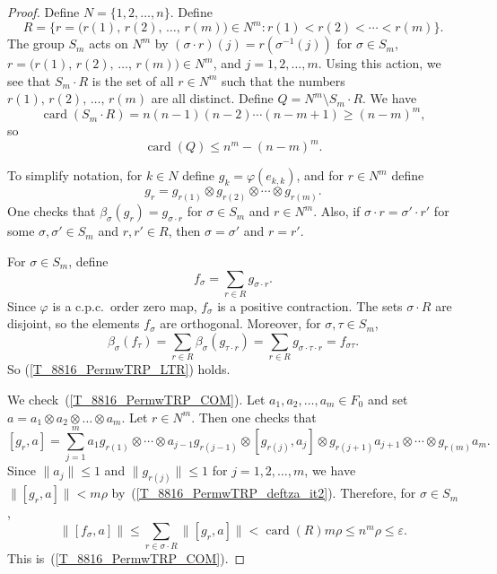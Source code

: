 \documentclass[11pt]{amsart}
\theoremstyle{plain}
\theoremstyle{definition}
\theoremstyle{remark}
\numberwithin{equation}{section}
\newcommand{\bt}{\beta}
\newcommand{\ep}{\varepsilon}
\newcommand{\sm}{\sigma}
\newcommand{\ph}{\varphi}
\newcommand{\rh}{\rho}
\newcommand{\ta}{\tau}
\newcommand{\card}{{\operatorname{card}}}
\begin{document}
\begin{proof}
Define $N = \{ 1, 2, \ldots, n \}$.
Define
\[
R = \bigl\{ r = \bigl( r (1), \, r (2), \, \ldots, \, r (m) \bigr)
   \in N^m \colon r (1) < r (2) < \cdots < r (m) \bigr\}.
\]
The group $S_m$ acts on $N^m$
by $(\sm \cdot r) (j) = r (\sm^{-1} (j))$
for $\sm \in S_m$,
$r = \bigl( r (1), \, r (2), \, \ldots, \, r (m) \bigr) \in N^m$,
and $j = 1, 2, \ldots, m$.
Using this action,
we see that $S_m \cdot R$
is the set of all $r \in N^m$ such that the numbers
$r (1), \, r (2), \, \ldots, \, r (m)$ are all distinct.
Define $Q = N^m \setminus S_m \cdot R$.
We have
%
\begin{equation}\label{Eq_8816_CardSmR}
\card (S_m \cdot R)
 = n (n - 1) (n - 2) \cdots (n - m + 1)
 \geq (n - m)^m,
\end{equation}
%
so
%
\begin{equation}\label{Eq_8816_CardQ}
\card (Q) \leq n^m -  (n - m)^m.
\end{equation}
%

To simplify notation,
for $k \in N$ define $g_k = \ph (e_{k, k})$,
and for $r \in N^m$ define
\[
g_r = g_{r (1)} \otimes g_{r (2)} \otimes \cdots \otimes g_{r (m)}.
\]
One checks that $\bt_{\sm} (g_r) = g_{\sm \cdot r}$
for $\sm \in S_m$ and $r \in N^m$.
Also, if $\sigma\cdot r= \sigma'\cdot r'$
for some $\sigma,\sigma' \in S_m$ and $r,r' \in R$, then
$\sigma =\sigma' $ and  $r=r'$.

For $\sm \in S_m$,
define
\[
f_{\sm} = \sum_{r \in R} g_{\sm \cdot r}.
\]
Since $\ph$ is a c.p.c.~order zero map,
$f_{\sm}$ is a positive contraction.
The sets $\sm \cdot R$ are disjoint,
so the elements $f_{\sm}$ are orthogonal.
Moreover,
for $\sm, \ta \in S_m$,
\[
\bt_{\sm} (f_{\ta})
 = \sum_{r \in R} \bt_{\sm} (g_{\ta \cdot r})
 = \sum_{r \in R} g_{\sm \cdot \ta \cdot r}
 = f_{\sm \ta}.
\]
So (\ref{T_8816_PermwTRP_LTR}) holds.

We check~(\ref{T_8816_PermwTRP_COM}).
Let $a_1, a_2, \ldots, a_m \in F_0$ and set
$a = a_1 \otimes a_2 \otimes \dots \otimes a_m$.
Let $r \in N^m$.
Then one checks that
\[
[ g_r, a ]
 = \sum_{j = 1}^m a_1 g_{r (1)} \otimes
       \cdots \otimes a_{j - 1} g_{r (j - 1)}
       \otimes [ g_{r (j)}, a_j] \otimes g_{r (j + 1)} a_{j + 1}
       \otimes
       \cdots \otimes g_{r (m)} a_m.
\]
Since $\| a_j \| \leq 1$ and $\| g_{r (j)} \| \leq 1$
for $j = 1, 2, \ldots, m$,
we have
$\| [ g_r, a ] \| < m \rh$ by~(\ref{T_8816_PermwTRP_deftza_it2}).
Therefore, for $\sm \in S_m$,
\[
\| [ f_{\sm}, a ] \|
  \leq \sum_{r \in \sm \cdot R} \| [ g_{r}, a ] \|
  < \card (R) m \rh
  \leq n^m \rh
  \leq \ep.
\]
This is~(\ref{T_8816_PermwTRP_COM}).


\end{proof}
\end{document}
